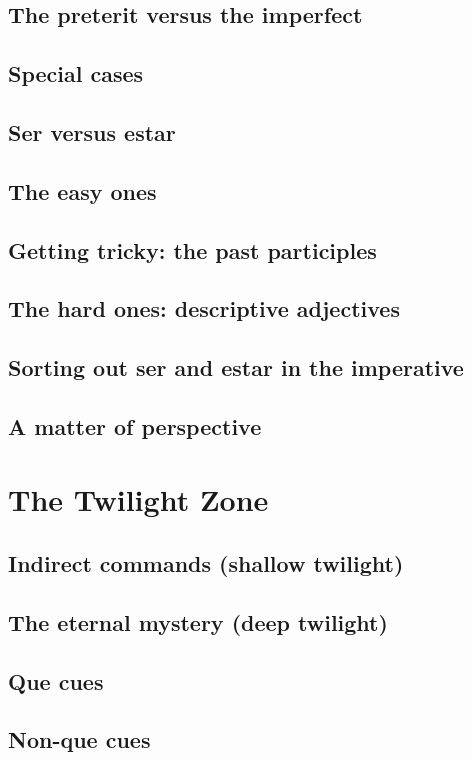 \section{The preterit versus the imperfect}
\section{Special cases}
\section{Ser versus estar}
\section{The easy ones}
\section{Getting tricky: the past participles}
\section{The hard ones: descriptive adjectives}
\section{Sorting out ser and estar in the imperative}
\section{A matter of perspective}

\chapter{The Twilight Zone}

\section{Indirect commands (shallow twilight)}
\section{The eternal mystery (deep twilight)}
\section{Que cues}
\section{Non-que cues}
